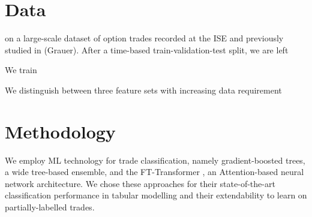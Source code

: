 












\section{Data}

on a large-scale dataset of option trades recorded at the ISE and  previously studied in (Grauer). After a time-based train-validation-test split, we are left

We train

We distinguish between three feature sets with increasing data requirement


\section{Methodology}

We employ ML technology for trade classification, namely gradient-boosted trees, a wide tree-based ensemble, and the FT-Transformer \autocite{gorishniyRevisitingDeepLearning2021}, an Attention-based neural network architecture. We chose these approaches for their state-of-the-art classification performance in tabular modelling \autocites[][]{gorishniyRevisitingDeepLearning2021}[][]{grinsztajnWhyTreebasedModels2022} and their extendability to learn on partially-labelled trades.



